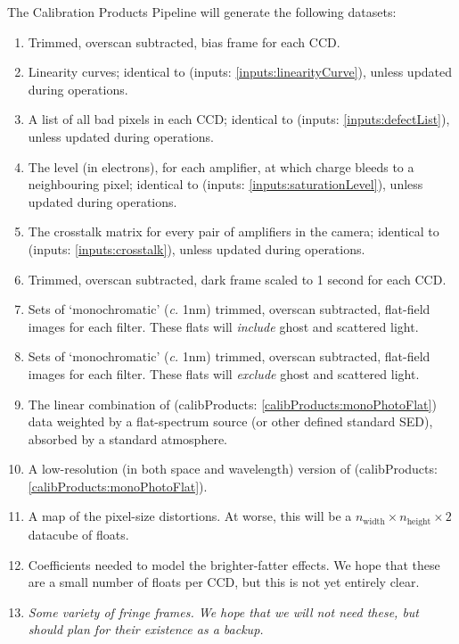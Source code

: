\documentclass[12pt]{article}
\renewcommand{\c}{\textit{c.}\xspace}
\newcommand{\inputData}[1]{(inputs: \ref{inputs:#1})}
\newcommand{\outputData}[1]{(calibProducts: \ref{calibProducts:#1})}
\begin{document}
The Calibration Products Pipeline will generate the following datasets:
\begin{enumerate}[label=\textbf{\S}\arabic*,itemsep=5pt]
   \item\label{calibProducts:bias} Trimmed, overscan subtracted, bias frame for each CCD.
   \item\label{calibProducts:linearityCurve} Linearity curves;
     identical to \inputData{linearityCurve}, unless updated during operations.
   \item\label{calibProducts:defectList} A list of all bad pixels in each CCD;
     identical to \inputData{defectList}, unless updated during operations.     
   \item\label{calibProducts:saturationLevel} The level (in electrons), for each amplifier, at which charge
     bleeds to a neighbouring pixel;
     identical to \inputData{saturationLevel}, unless updated during operations.     
   \item\label{calibProducts:crosstalk}  The crosstalk matrix for every pair of amplifiers in the camera;
     identical to \inputData{crosstalk}, unless updated during operations.
   \item\label{calibProducts:dark} Trimmed, overscan subtracted, dark frame scaled to 1 second for each CCD.
   \item\label{calibProducts:monoFlat} Sets of `monochromatic' (\c 1nm) trimmed, overscan subtracted,
     flat-field images for each filter.  These flats will \textit{include} ghost and scattered light.
   \item\label{calibProducts:monoPhotoFlat} Sets of `monochromatic' (\c 1nm) trimmed, overscan subtracted,
     flat-field images for each filter.  These flats will \textit{exclude} ghost and scattered light.
   \item\label{calibProducts:standardPhotoFlat} The linear combination of \outputData{monoPhotoFlat}
     data weighted by a flat-spectrum source (or other defined standard SED), absorbed by a standard
     atmosphere.
   \item\label{calibProducts:monoPhotoFlatLowRes} A low-resolution (in both space and wavelength)
     version of \outputData{monoPhotoFlat}.
   \item\label{calibProducts:pixelSizeMap}  A map of the pixel-size distortions.  At worse, this will be
     a $n_{\mbox{width}}\times n_{\mbox{height}}\times 2$ datacube of floats.
   \item\label{calibProducts:brighterFatterCoeffs}  Coefficients needed to model the brighter-fatter effects.
     We hope that these are a small number of floats per CCD, but this is not yet entirely clear.
   \item\label{calibProducts:fringeFrames}  \textit{Some variety of fringe frames.  We hope that we will not
     need these, but should plan for their existence as a backup.}
\end{enumerate}
\end{document}

